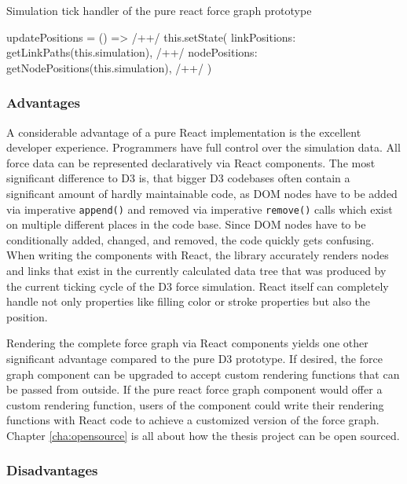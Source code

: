 \begin{program}
\caption{Simulation tick handler of the pure react force graph prototype}
\label{prog:pureReactTickHandler}
\begin{JsCode}
updatePositions = () => { /+\label{line:updatePositions}+/
  this.setState({
    linkPositions: getLinkPaths(this.simulation), /+\label{line:getLinkPositions}+/
    nodePositions: getNodePositions(this.simulation), /+\label{line:getNodePositions}+/
  })
}
\end{JsCode}
\end{program}

\subsubsection{Advantages}


A considerable advantage of a pure React implementation is the excellent developer experience. Programmers have full control over the simulation data. All force data can be represented declaratively via React components. The most significant difference to D3 is, that bigger D3 codebases often contain a significant amount of hardly maintainable code, as DOM nodes have to be added via imperative \texttt{append()} and removed via imperative \texttt{remove()} calls which exist on multiple different places in the code base. Since DOM nodes have to be conditionally added, changed, and removed, the code quickly gets confusing. When writing the components with React, the library accurately renders nodes and links that exist in the currently calculated data tree that was produced by the current ticking cycle of the D3 force simulation. React itself can completely handle not only properties like filling color or stroke properties but also the position.

Rendering the complete force graph via React components yields one other significant advantage compared to the pure D3 prototype. If desired, the force graph component can be upgraded to accept custom rendering functions that can be passed from outside. If the pure react force graph component would offer a custom rendering function, users of the component could write their rendering functions with React code to achieve a customized version of the force graph. Chapter \ref{cha:opensource} is all about how the thesis project can be open sourced.

\subsubsection{Disadvantages}

